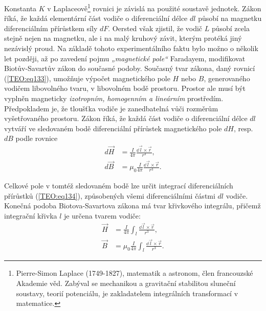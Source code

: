     Konstanta \(K\) v Laplaceově\footnote{Pierre-Simon Laplace (1749-1827), matematik a astronom,
    člen francouzské Akademie věd. Zabýval se mechanikou a gravitační stabilitou sluneční soustavy,
    teorií potenciálu, je zakladatelem integrálních transformací v matematice.} rovnici je závislá
    na použité soustavě jednotek. Zákon říká, že každá elementární část vodiče o diferenciální délce
    \(dl\) působí na magnetku diferenciálním přírůstkem síly \(dF\). Oersted však zjistil, že vodič
    \(L\) působí zcela stejně nejen na magnetku, ale i na malý kruhový závit, kterým protéká jiný
    nezávislý proud. Na základě tohoto experimentálního faktu bylo možno o několik let později, až
    po zavedení pojmu \emph{„magnetické pole“} Faradayem, modifikovat Biotův-Savartův zákon do
    současné podoby. Současný tvar zákona, daný rovnicí (\ref{TEO:eq133}), umožňuje výpočet
    magnetického pole \(H\) nebo \(B\), generovaného vodičem libovolného tvaru, v libovolném bodě
    prostoru. Prostor ale musí být vyplněn magneticky \emph{izotropním, homogenním a lineárním}
    prostředím. Předpokladem je, že tloušťka vodiče je zanedbatelná vůči rozměrům vyšetřovaného
    prostoru. Zákon říká, že každá část vodiče o diferenciální délce \(dl\) vytváří ve sledovaném
    bodě diferenciální přírůstek magnetického pole \(dH\), resp. \(dB\) podle rovnice
    \begin{subequations}\label{TEO:eq134}
      \begin{align}
        d\vec{H} &= \frac{I}{4\pi}\frac{\dd{\vec{l}}\times \vec{r}}{r^3},      \label{TEO:eq134a} \\
        d\vec{B} &= \mu_0\frac{I}{4\pi}\frac{\dd{\vec{l}}\times \vec{r}}{r^3}. \label{TEO:eq134b}
      \end{align}    
    \end{subequations}


    Celkové pole v tomtéž sledovaném bodě lze určit integrací diferenciálních přírůstků
    (\ref{TEO:eq134}), způsobených všemi diferenciálními částmi \(dl\) vodiče. Konečná podoba
    Biotova-Savartova zákona má tvar křivkového integrálu, přičemž integrační křivka \(l\) je určena
    tvarem vodiče:
    \begin{subequations}\label{TEO:eq135}
      \begin{align}
        \vec{H}&=\frac{I}{4\pi}\int_l\frac{\dd{\vec{l}}\times\vec{r}}{r^3},     \label{TEO:eq135a}\\
        \vec{B}&=\mu_0\frac{I}{4\pi}\int_l\frac{\dd{\vec{l}}\times\vec{r}}{r^3}.\label{TEO:eq135b}
      \end{align}    
    \end{subequations}
    
